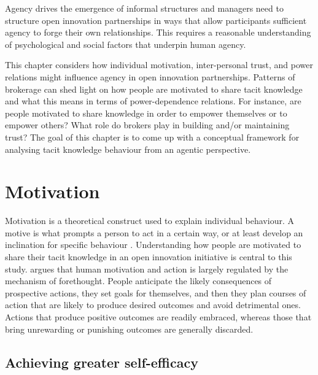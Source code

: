 Agency drives the emergence of informal structures and managers need to structure open innovation partnerships in ways that allow participants sufficient agency to forge their own relationships. This requires a reasonable understanding of psychological and social factors that underpin human agency. 



This chapter considers how individual motivation, inter-personal trust, and power relations might influence agency in open innovation partnerships. Patterns of brokerage can shed light on how people are motivated to share tacit knowledge and what this means in terms of power-dependence relations. For instance, are people motivated to share knowledge in order to empower themselves or to empower others? What role do brokers play in building and/or maintaining trust? The goal of this chapter is to come up with a conceptual framework for analysing tacit knowledge behaviour from an agentic perspective.\medskip 

\section{Motivation}

Motivation is a theoretical construct used to explain individual behaviour. A motive is what prompts a person to act in a certain way, or at least develop an inclination for specific behaviour \citep{pardee1990motivation}. Understanding how people are motivated to share their tacit knowledge in an open innovation initiative is central to this study. \citet{bandura1999social} argues that human motivation and action is largely regulated by the mechanism of forethought. People anticipate the likely consequences of prospective actions, they set goals for themselves, and then they plan courses of action that are likely to produce desired outcomes and avoid detrimental ones. Actions that produce positive outcomes are readily embraced, whereas those that bring unrewarding or punishing outcomes are generally discarded.

\subsection{Achieving greater self-efficacy}

